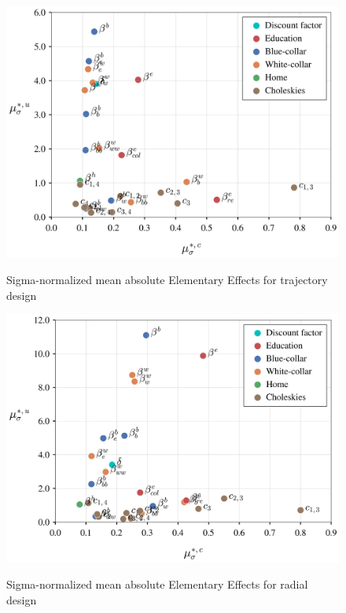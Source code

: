 \documentclass[a4paper,12pt]{article}
\begin{document}
\newpage
\begin{figure}[H]
	\caption{Sigma-normalized mean absolute Elementary Effects for trajectory design}
	\centering
	\includegraphics[scale=0.52]{../../../scrypy/figures/scatter_traj}
	\label{fig:traj}
\end{figure}

\begin{figure}[H]
	\caption{Sigma-normalized mean absolute Elementary Effects for radial design}
	\centering
	\includegraphics[scale=0.52]{../../../scrypy/figures/scatter_rad}
	\label{fig:rad}
\end{figure}



\newpage

\end{document}
